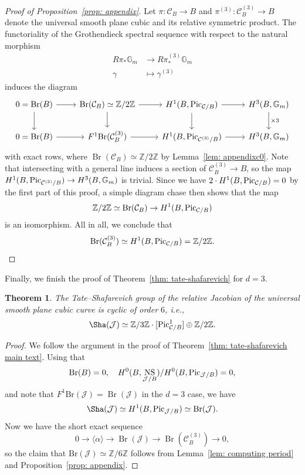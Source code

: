 \documentclass[11pt]{amsart}
\theoremstyle{plain}
\newtheorem{thm}{Theorem}[section]
\theoremstyle{definition}
\theoremstyle{remark}
\DeclareMathOperator{\Br}{Br}
\newcommand{\Pic}{\mathop{\rm Pic}\nolimits}
\DeclareMathOperator{\NS}{NS}
\begin{document}
\begin{proof}[Proof of Proposition~\ref{prop: appendix}]
Let $\pi \colon \mathcal C_B \to B$ and $\pi^{(3)} \colon \mathcal C^{(3)}_B \to B$ denote the universal smooth plane cubic and its relative symmetric product. The functoriality of the Grothendieck spectral sequence with respect to the natural morphism
\begin{align*}R\pi_* \mathbb G_m &\to R\pi^{(3)}_* \mathbb G_m \\
\gamma &\mapsto \gamma^{(3)}
\end{align*}
induces the diagram
$$\begin{tikzcd}
  0 = \Br(B) \arrow[r] \arrow[d] &\Br(\mathcal C_B)\simeq \mathbb Z/2\mathbb Z \arrow[r] \arrow[d] & {H^1(B, \Pic_{\mathcal C/B})} \arrow[d] \arrow[r] & {H^3(B, \mathbb G_m)} \arrow[d, "\times 3"] \\
0 = \Br(B) \arrow[r] & F^1 \mathrm{Br}(\mathcal C_B^{(3)}) \arrow[r] & {H^1(B, \Pic_{\mathcal C^{(3)}/B})} \arrow[r]              & {H^3(B, \mathbb G_m)}                     
\end{tikzcd}$$
with exact rows, where $\Br(\mathcal C_B) \simeq \mathbb Z / 2 \mathbb Z$ by Lemma~\ref{lem: appendixc0}. Note that intersecting with a general line induces a section of $\mathcal C^{(3)}_B \to B$, so the map $H^1(B, \Pic_{\mathcal C^{(3)} /B}) \to H^3(B, \mathbb G_m)$ is trivial. Since we have $2 \cdot H^1(B, \Pic_{\mathcal C /B}) = 0$ by the first part of this proof, a simple diagram chase then shows that the map
$$\mathbb Z / 2 \mathbb Z \simeq \Br(\mathcal C_B) \to H^1(B, \Pic_{\mathcal C / B})$$
is an isomorphism.
All in all, we conclude that
\[
\Br(\mathcal C^{(3)}_B) \simeq H^1(B, \Pic_{\mathcal C/B}) = \mathbb Z / 2 \mathbb Z.
\qedhere
\]
\end{proof}

Finally, we finish the proof of Theorem~\ref{thm: tate-shafarevich} for $d = 3$.
\begin{thm}
The Tate--Shafarevich group of the relative Jacobian of the universal smooth plane cubic curve is cyclic of order $6$, i.e.,
$$\Sha(\mathcal J) \simeq \mathbb Z / 3 \mathbb Z \cdot [\Pic^1_{\mathcal C / B}] \oplus \mathbb Z / 2 \mathbb Z.$$
\end{thm}
\begin{proof}
    We follow the argument in the proof of Theorem~\ref{thm: tate-shafarevich main text}. Using that
    \[
    \mathrm{Br}(B) = 0, \quad H^0(B, \NS_{\mathcal{J} / B}) / H^0(B, \Pic_{\mathcal{J}/B}) = 0,
    \]
    and note that $F^1\mathrm{Br}(\mathcal{J}) = \Br(\mathcal{J})$ in the $d=3$ case, we have
    \[
    \Sha(\mathcal{J}) \simeq H^1(B, \mathrm{Pic}_{\mathcal{J}/B}) \simeq \mathrm{Br}(\mathcal{J}).
    \]
    Now we have the short exact sequence
    $$0 \to \langle \alpha\rangle \to \Br(\mathcal J) \to \Br(\mathcal C^{(3)}_B) \to 0,$$
    so the claim that $\mathrm{Br}(\mathcal{J}) \simeq \mathbb Z/6\mathbb Z$ follows from Lemma~\ref{lem: computing period} and Proposition~\ref{prop: appendix}.
\end{proof}
\end{document}
